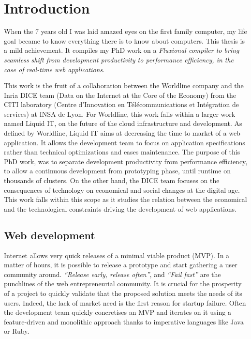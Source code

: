 \chapter{Introduction} \label{chapter:conclusion}
\minitoc
\eject

When the 7 years old I was laid amazed eyes on the first family computer, my life goal became to know everything there is to know about computers.
This thesis is a mild achievement.
It compiles my PhD work on a
\textit{Fluxional compiler to bring seamless shift from development productivity to performance efficiency, in the case of real-time web applications}.


This work is the fruit of a collaboration between the Worldline company and the Inria DICE team (Data on the Internet at the Core of the Economy) from the CITI laboratory (Centre d’Innovation en Télécommunications et Intégration
de services) at INSA de Lyon.
For Worldline, this work falls within a larger work named Liquid IT, on the future of the cloud infrastructure and development.
As defined by Worldline, Liquid IT aims at decreasing the time to market of a web application.
It allows the development team to focus on application specifications rather than technical optimizations and eases maintenance.
The purpose of this PhD work, was to separate development productivity from performance efficiency, to allow a continuous development from prototyping phase, until runtime on thousands of clusters.
On the other hand, the DICE team focuses on the consequences of technology on economical and social changes at the digital age.
This work falls within this scope as it studies the relation between the economical and the technological constraints driving the development of web applications.

\section{Web development}

Internet allows very quick releases of a minimal viable product (MVP).
In a matter of hours, it is possible to release a prototype and start gathering a user community around.
\textit{``Release early, release often''}, and \textit{``Fail fast''} are the punchlines of the web entrepreneurial community.
It is crucial for the prosperity of a project to quickly validate that the proposed solution meets the needs of its users.
Indeed, the lack of market need is the first reason for startup failure.
Often the development team quickly concretises an MVP and iterates on it using a feature-driven and monolithic approach thanks to imperative languages like Java or Ruby.

